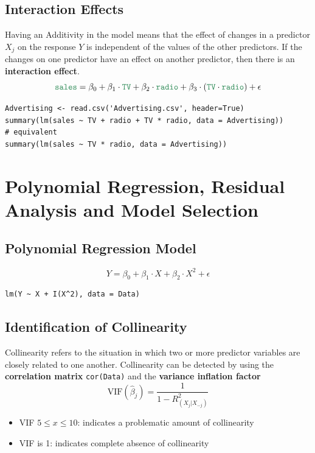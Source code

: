 \documentclass[11pt]{article}
\newcommand*\predvar[1]{{\color{SeaGreen4} \texttt{#1}}}
\begin{document}
\subsection{Interaction Effects}
Having an Additivity in the model means that the effect of changes in a predictor $X_j$ on the response $Y$ is independent of the values of the other predictors. If the changes on one predictor have an effect on another predictor, then there is an \textbf{interaction effect}.
\begin{equation*}
	\predvar{sales} = \beta_0 + \beta_1 \cdot \predvar{TV} + \beta_2\cdot\predvar{radio} + \beta_3\cdot(\predvar{TV}\cdot\predvar{radio}) + \epsilon
\end{equation*}
\begin{verbatim}
Advertising <- read.csv('Advertising.csv', header=True)
summary(lm(sales ~ TV + radio + TV * radio, data = Advertising))
# equivalent
summary(lm(sales ~ TV * radio, data = Advertising))
\end{verbatim}

\section{Polynomial Regression, Residual Analysis and Model Selection}

\subsection{Polynomial Regression Model}

\begin{equation*}
	Y = \beta_0 + \beta_1\cdot X + \beta_2\cdot X^2 + \epsilon
\end{equation*}

\begin{verbatim}
lm(Y ~ X + I(X^2), data = Data)
\end{verbatim}

\subsection{Identification of Collinearity}
Collinearity refers to the situation in which two or more predictor variables are closely related to one another. Collinearity can be detected by using the \textbf{correlation matrix} \texttt{cor(Data)} and the \textbf{variance inflation factor}
\begin{equation*}
	\text{VIF}(\hat{\beta}_j) = \frac{1}{1- R_{(X_j|X_{-j})}^2}
\end{equation*}
\begin{itemize}
	\item VIF $5\leq x\leq 10$: indicates a problematic amount of collinearity
	\item VIF is 1: indicates complete absence of collinearity
\end{itemize}
\end{document}
